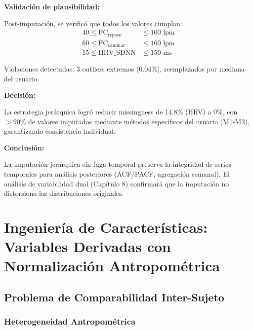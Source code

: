 \documentclass[12pt,letterpaper,twoside]{report}
\begin{document}
\begin{calculobox}
\begin{calculobox}
\textbf{Validación de plausibilidad:}

Post-imputación, se verificó que todos los valores cumplan:
\begin{align}
40 \leq \text{FC}_{\text{reposo}} &\leq 100 \text{ lpm} \\
60 \leq \text{FC}_{\text{caminar}} &\leq 160 \text{ lpm} \\
15 \leq \text{HRV\_SDNN} &\leq 150 \text{ ms}
\end{align}

Violaciones detectadas: 3 outliers extremos (0.04\%), reemplazados por mediana del usuario.
\end{calculobox}

\begin{decisionbox}
\textbf{Decisión:}

La estrategia jerárquica logró reducir missingness de 14.8\% (HRV) a 0\%, con $>90\%$ de valores imputados mediante métodos específicos del usuario (M1-M3), garantizando consistencia individual.
\end{decisionbox}

\begin{conclusionbox}
\textbf{Conclusión:}

La imputación jerárquica sin fuga temporal preserva la integridad de series temporales para análisis posteriores (ACF/PACF, agregación semanal). El análisis de variabilidad dual (Capítulo 8) confirmará que la imputación no distorsiona las distribuciones originales.
\end{conclusionbox}

\chapter{Ingeniería de Características: Variables Derivadas con Normalización Antropométrica}

\section{Problema de Comparabilidad Inter-Sujeto}

\subsection{Heterogeneidad Antropométrica}


\end{calculobox}
\end{document}
